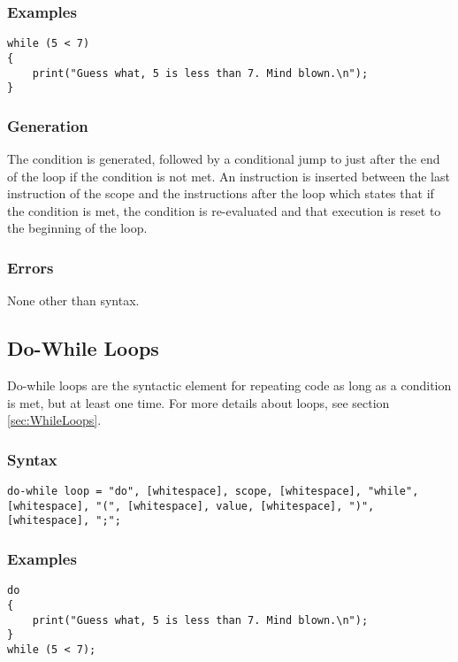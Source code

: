 \documentclass[10pt,a4paper]{article}
\begin{document}
\subsubsection{Examples}
\begin{verbatim}
while (5 < 7)
{
    print("Guess what, 5 is less than 7. Mind blown.\n");
}
\end{verbatim}

\subsubsection{Generation}
The condition is generated, followed by a conditional jump to just after the end of the loop if the condition is not met. An instruction is inserted between the last instruction of the scope and the instructions after the loop which states that if the condition is met, the condition is re-evaluated and that execution is reset to the beginning of the loop.

\subsubsection{Errors}
None other than syntax.

\newpage








\subsection{Do-While Loops}
\label{sec:DoWhileLoops}
Do-while loops are the syntactic element for repeating code as long as a condition is met, but at least one time. For more details about loops, see section \ref{sec:WhileLoops}.

\subsubsection{Syntax}
\begin{verbatim}
do-while loop = "do", [whitespace], scope, [whitespace], "while", [whitespace], "(", [whitespace], value, [whitespace], ")", [whitespace], ";";
\end{verbatim}

\subsubsection{Examples}
\begin{verbatim}
do
{
    print("Guess what, 5 is less than 7. Mind blown.\n");
}
while (5 < 7);
\end{verbatim}
\end{document}

